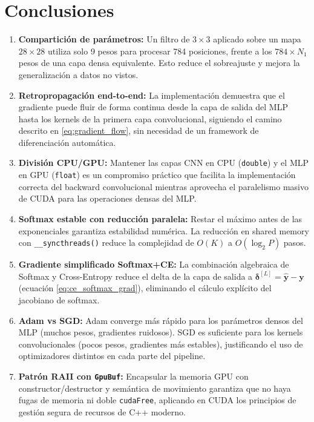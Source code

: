 \documentclass[12pt,a4paper]{article}
\begin{document}
\section{Conclusiones}

\begin{enumerate}
  \item \textbf{Compartición de parámetros:} Un filtro de $3\times3$ aplicado sobre
    un mapa $28\times28$ utiliza solo 9 pesos para procesar 784 posiciones, frente a
    los $784\times N_1$ pesos de una capa densa equivalente. Esto reduce el sobreajuste
    y mejora la generalización a datos no vistos.

  \item \textbf{Retropropagación end-to-end:} La implementación demuestra que el
    gradiente puede fluir de forma continua desde la capa de salida del MLP hasta los
    kernels de la primera capa convolucional, siguiendo el camino descrito en
    \eqref{eq:gradient_flow}, sin necesidad de un framework de diferenciación automática.

  \item \textbf{División CPU/GPU:} Mantener las capas CNN en CPU (\texttt{double}) y
    el MLP en GPU (\texttt{float}) es un compromiso práctico que facilita la
    implementación correcta del backward convolucional mientras aprovecha el paralelismo
    masivo de CUDA para las operaciones densas del MLP.

  \item \textbf{Softmax estable con reducción paralela:} Restar el máximo antes de
    las exponenciales garantiza estabilidad numérica. La reducción en shared memory con
    \texttt{\_\_syncthreads()} reduce la complejidad de $O(K)$ a $O(\log_2 P)$ pasos.

  \item \textbf{Gradiente simplificado Softmax+CE:} La combinación algebraica de
    Softmax y Cross-Entropy reduce el delta de la capa de salida a
    $\boldsymbol{\delta}^{[L]} = \hat{\mathbf{y}} - \mathbf{y}$ (ecuación
    \eqref{eq:ce_softmax_grad}), eliminando el cálculo explícito del jacobiano de
    softmax.

  \item \textbf{Adam vs SGD:} Adam converge más rápido para los parámetros densos del
    MLP (muchos pesos, gradientes ruidosos). SGD es suficiente para los kernels
    convolucionales (pocos pesos, gradientes más estables), justificando el uso de
    optimizadores distintos en cada parte del pipeline.

  \item \textbf{Patrón RAII con \texttt{GpuBuf}:} Encapsular la memoria GPU con
    constructor/destructor y semántica de movimiento garantiza que no haya fugas de
    memoria ni doble \texttt{cudaFree}, aplicando en CUDA los principios de gestión
    segura de recursos de C++ moderno.
\end{enumerate}
\end{document}
